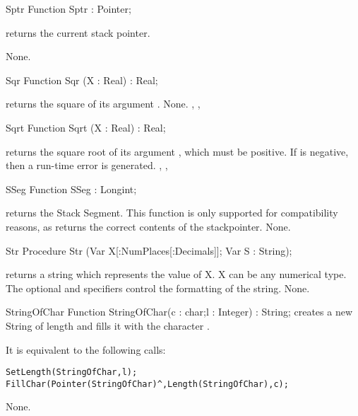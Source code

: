 
\begin{function}{Sptr}
\Declaration
Function Sptr  : Pointer;

\Description
{} returns the current stack pointer.

\Errors
None.
\SeeAlso
{}
\end{function}


\begin{function}{Sqr}
\Declaration
Function Sqr (X : Real) : Real;

\Description
{} returns the square of its argument .
\Errors
None.
\SeeAlso
{}, , 
\end{function}


\begin{function}{Sqrt}
\Declaration
Function Sqrt (X : Real) : Real;

\Description
{} returns the square root of its argument , which must be
positive.
\Errors
If  is negative, then a run-time error is generated.
\SeeAlso
{}, , 
\end{function}


\begin{function}{SSeg}
\Declaration
Function SSeg  : Longint;

\Description
  returns the Stack Segment. This function is only
 supported for compatibility reasons, as  returns the
correct contents of the stackpointer.
\Errors
None.
\SeeAlso
{}
\end{function}


\begin{procedure}{Str}
\Declaration
Procedure Str (Var X[:NumPlaces[:Decimals]]; Var S : String);

\Description
{} returns a string which represents the value of X. X can be any
numerical type.
The optional  and  specifiers control the
formatting of the string.
\Errors
None.
\SeeAlso
{}
\end{procedure}


\begin{function}{StringOfChar}
\Declaration
Function StringOfChar(c : char;l : Integer) : String;
\Description
{} creates a new String of length  and fills
it with the character .

It is equivalent to  the following calls:
\begin{verbatim}
SetLength(StringOfChar,l);
FillChar(Pointer(StringOfChar)^,Length(StringOfChar),c);
\end{verbatim}
\Errors
None.
\SeeAlso
{}
\end{function}

